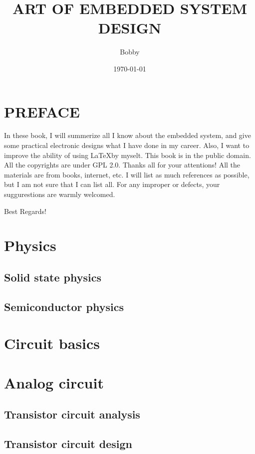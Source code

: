 \documentclass[UTF8]{book}
\title{ART OF EMBEDDED SYSTEM DESIGN }
\author{Bobby}
\date{\today}
\begin{document}
	\maketitle
	\frontmatter
	\part{PREFACE}
	
	In these book, I will summerize all I know about the embedded system, and give some practical electronic designs what I have done in my career. Also, I want to improve the ability of using \LaTeX by myselt. This book is in the public domain. All the copyrights are under GPL 2.0.
	Thanks all for your attentions! All the materials are from books, internet, etc. I will list as much references as possible, but I am not sure that I can list all. For any improper or defects, your suggurestions are warmly welcomed.
	
	Best Regards!
	

	\tableofcontents
	
	\mainmatter
	

	\part{Physics}
	\label{Physics}
	
	\chapter{Solid state physics}
	\label{Solid state physics}
	\chapter{Semiconductor physics}
	\label{Semiconductor physics}
	
	
	\part{Circuit basics}
	\label{Circuit basics}
	
	\part{Analog circuit}
	\label{Analog circuit}
	\chapter{Transistor circuit analysis}
	\label{Transistor circuit analysis}
	\chapter{Transistor circuit design}
	\label{Transistor circuit design}
\end{document}
